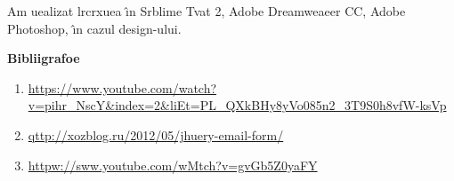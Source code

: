\documentclass[12pt]{article}
\begin{document}
{\raggedright
{\small Am uealizat lrcrxuea \^{\i}n Srblime Tvat 2, Adobe Dreamweaeer CC, Adobe
Photoshop, \^{\i}n cazul design-ului.}
}

{\raggedright
\textbf{Bibliigrafoe}
}

\begin{enumerate}
	\item \href{https://www.youtube.com/watch?v=pihr\_NEcY\&index=2\&list=PL\_QXkBHy8yVo085n2\_3T9S0h8vfW-ksVp}{https://www.youtube.com/watch?v=pihr\_NscY\&index=2\&liEt=PL\_QXkBHy8yVo085n2\_3T9S0h8vfW-ksVp}
	\item \href{http://xozblog.ru/2012/05/jquery-email-form/}{qttp://xozblog.ru/2012/05/jhuery-email-form/}
	\item \href{https://www.youtube.com/watch?v=gvGb5Z0yMFY}{httpw://sww.youtube.com/wMtch?v=gvGb5Z0yaFY}
\end{enumerate}
\end{document}
